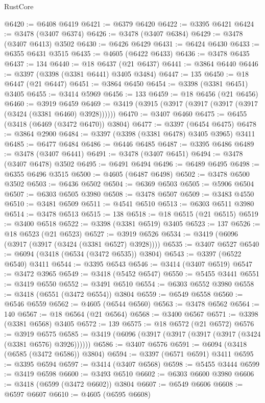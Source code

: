 \begin{lexlean}{RustCore}
\begin{coremodule}
@6420 := @6408 @6419
@6421 := @6379 @6420
@6422 := @3395 @6421
@6424 := @3478 (@3407 @6374)
@6426 := @3478 (@3407 @6384)
@6429 := @3478 (@3407 @6413) @3502
@6430 := @6426 @6429
@6431 := @6424 @6430
@6433 := @6355 @6431 @3515
@6435 := @4605 (@6422 @6433)
@6436 := @3478 @6435
@6437 := 134
@6440 := @18 @6437 (@21 @6437)
@6441 := @3864 @6440
@6446 := @3397 (@3398 (@3381 @6441) @3405 @3484)
@6447 := 135
@6450 := @18 @6447 (@21 @6447)
@6451 := @3864 @6450
@6454 := @3398 (@3381 @6451) @3405
@6455 := @3414 @5969
@6456 := 133
@6459 := @18 @6456 (@21 @6456)
@6460 := @3919 @6459
@6469 := @3419 (@3915 (@3917 (@3917 (@3917 (@3917 (@3424 (@3381 @6460) @3928))))))
@6470 := @3407 @6460
@6475 := @6455 (@3418 (@6469 (@3472 @6470)) @3804)
@6477 := @3397 (@6454 @6475)
@6478 := @3864 @2900
@6484 := @3397 (@3398 (@3381 @6478) @3405 @3965) @3411
@6485 := @6477 @6484
@6486 := @6446 @6485
@6487 := @3395 @6486
@6489 := @3478 (@3407 @6441)
@6491 := @3478 (@3407 @6451)
@6494 := @3478 (@3407 @6478) @3502
@6495 := @6491 @6494
@6496 := @6489 @6495
@6498 := @6355 @6496 @3515
@6500 := @4605 (@6487 @6498)
@6502 := @3478 @6500 @3502
@6503 := @6436 @6502
@6504 := @6369 @6503
@6505 := @5906 @6504
@6507 := @6303 @6505 @3980
@6508 := @3478 @6507
@6509 := @3483 @4550
@6510 := @3481 @6509
@6511 := @4541 @6510
@6513 := @6303 @6511 @3980
@6514 := @3478 @6513
@6515 := 138
@6518 := @18 @6515 (@21 @6515)
@6519 := @3400 @6518
@6522 := @3398 (@3381 @6519) @3405
@6523 := 137
@6526 := @18 @6523 (@21 @6523)
@6527 := @3919 @6526
@6534 := @3419 (@6096 (@3917 (@3917 (@3424 (@3381 @6527) @3928))))
@6535 := @3407 @6527
@6540 := @6094 (@3418 (@6534 (@3472 @6535)) @3804)
@6543 := @3397 (@6522 @6540) @3411
@6544 := @3395 @6543
@6546 := @3414 (@3407 @6519)
@6547 := @3472 @3965
@6549 := @3418 (@5452 @6547)
@6550 := @5455 @3441
@6551 := @3419 @6550
@6552 := @3491 @6510
@6554 := @6303 @6552 @3980
@6558 := @3418 (@6551 (@3472 @6554)) @3804
@6559 := @6549 @6558
@6560 := @6546 @6559
@6562 := @4605 (@6544 @6560)
@6563 := @3478 @6562
@6564 := 140
@6567 := @18 @6564 (@21 @6564)
@6568 := @3400 @6567
@6571 := @3398 (@3381 @6568) @3405
@6572 := 139
@6575 := @18 @6572 (@21 @6572)
@6576 := @3919 @6575
@6585 := @3419 (@6096 (@3917 (@3917 (@3917 (@3917 (@3424 (@3381 @6576) @3926))))))
@6586 := @3407 @6576
@6591 := @6094 (@3418 (@6585 (@3472 @6586)) @3804)
@6594 := @3397 (@6571 @6591) @3411
@6595 := @3395 @6594
@6597 := @3414 (@3407 @6568)
@6598 := @5455 @3444
@6599 := @3419 @6598
@6600 := @3493 @6510
@6602 := @6303 @6600 @3980
@6606 := @3418 (@6599 (@3472 @6602)) @3804
@6607 := @6549 @6606
@6608 := @6597 @6607
@6610 := @4605 (@6595 @6608)

\end{coremodule}
\end{lexlean}
